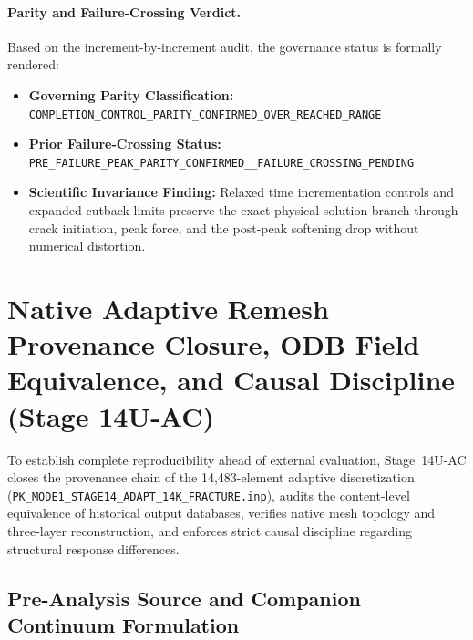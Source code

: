 \paragraph{Parity and Failure-Crossing Verdict.}
Based on the increment-by-increment audit, the governance status is formally rendered:
\begin{itemize}
  \item \textbf{Governing Parity Classification:} \texttt{COMPLETION\_CONTROL\_PARITY\_CONFIRMED\_OVER\_REACHED\_RANGE}
  \item \textbf{Prior Failure-Crossing Status:} \texttt{PRE\_FAILURE\_PEAK\_PARITY\_CONFIRMED\_\_FAILURE\_CROSSING\_PENDING}
  \item \textbf{Scientific Invariance Finding:} Relaxed time incrementation controls and expanded cutback limits preserve the exact physical solution branch through crack initiation, peak force, and the post-peak softening drop without numerical distortion.
\end{itemize}

\section{Native Adaptive Remesh Provenance Closure, ODB Field Equivalence, and Causal Discipline (Stage 14U-AC)}
\label{sec:stage14uac_native_remesh_provenance}

To establish complete reproducibility ahead of external evaluation, Stage~14U-AC closes the provenance chain of the 14,483-element adaptive discretization (\texttt{PK\_MODE1\_STAGE14\_ADAPT\_14K\_FRACTURE.inp}), audits the content-level equivalence of historical output databases, verifies native mesh topology and three-layer reconstruction, and enforces strict causal discipline regarding structural response differences.

\subsection{Pre-Analysis Source and Companion Continuum Formulation}
\label{subsec:stage14uac_preanalysis_source}

